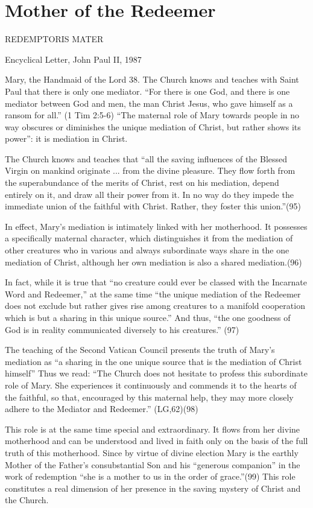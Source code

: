 \documentclass[oneside]{book}
\begin{document}
\chapter{Mother of the Redeemer}

REDEMPTORIS MATER

Encyclical Letter, John Paul II, 1987


Mary, the Handmaid of the Lord
38. The Church knows and teaches with Saint Paul that there is only one
mediator. ``For there is one God, and there is one mediator between God and men,
the man Christ Jesus, who gave himself as a ransom for all.'' (1 Tim 2:5-6)
``The maternal role of Mary towards people in no way obscures or diminishes the
unique mediation of Christ, but rather shows its power'': it is mediation in
Christ.

The Church knows and teaches that ``all the saving influences of the Blessed
Virgin on mankind originate ... from the divine pleasure. They flow forth from
the superabundance of the merits of Christ, rest on his mediation, depend
entirely on it, and draw all their power from it. In no way do they impede the
immediate union of the faithful with Christ. Rather, they foster this
union.''(95)

In effect, Mary's mediation is intimately linked with her motherhood. It
possesses a specifically maternal character, which distinguishes it from the
mediation of other creatures who in various and always subordinate ways share in
the one mediation of Christ, although her own mediation is also a shared
mediation.(96)

In fact, while it is true that ``no creature could ever be classed with the
Incarnate Word and Redeemer,'' at the same time ``the unique mediation of the
Redeemer does not exclude but rather gives rise among creatures to a manifold
cooperation which is but a sharing in this unique source.'' And thus, ``the one
goodness of God is in reality communicated diversely to his creatures.'' (97)

The teaching of the Second Vatican Council presents the truth of Mary's
mediation as ``a sharing in the one unique source that is the mediation of
Christ himself'' Thus we read: ``The Church does not hesitate to profess this
subordinate role of Mary. She experiences it continuously and commends it to the
hearts of the faithful, so that, encouraged by this maternal help, they may more
closely adhere to the Mediator and Redeemer.'' (LG,62)(98)

This role is at the same time special and extraordinary. It flows from her
divine motherhood and can be understood and lived in faith only on the basis of
the full truth of this motherhood. Since by virtue of divine election Mary is
the earthly Mother of the Father's consubstantial Son and his ``generous
companion'' in the work of redemption ``she is a mother to us in the order of
grace.''(99) This role constitutes a real dimension of her presence in the
saving mystery of Christ and the Church.
\end{document}
